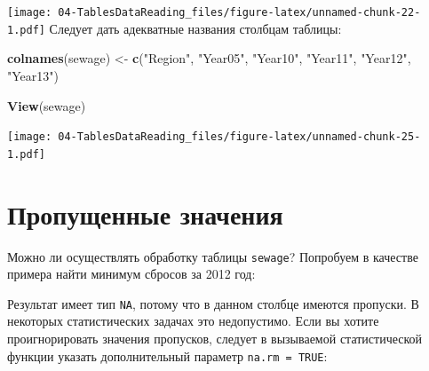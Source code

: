 \documentclass[]{book}
\newenvironment{Shaded}{\begin{snugshade}}{\end{snugshade}}
\newcommand{\KeywordTok}[1]{\textcolor[rgb]{0.13,0.29,0.53}{\textbf{#1}}}
\newcommand{\DataTypeTok}[1]{\textcolor[rgb]{0.13,0.29,0.53}{#1}}
\newcommand{\StringTok}[1]{\textcolor[rgb]{0.31,0.60,0.02}{#1}}
\newcommand{\OtherTok}[1]{\textcolor[rgb]{0.56,0.35,0.01}{#1}}
\newcommand{\OperatorTok}[1]{\textcolor[rgb]{0.81,0.36,0.00}{\textbf{#1}}}
\newcommand{\NormalTok}[1]{#1}
\begin{document}
\texttt{[image: 04-TablesDataReading\_files/figure-latex/unnamed-chunk-22-1.pdf]}
Следует дать адекватные названия столбцам таблицы:

\begin{Shaded}
\begin{Highlighting}[]
\KeywordTok{colnames}\NormalTok{(sewage) <-}\StringTok{ }\KeywordTok{c}\NormalTok{(}\StringTok{"Region"}\NormalTok{, }\StringTok{"Year05"}\NormalTok{, }\StringTok{"Year10"}\NormalTok{, }\StringTok{"Year11"}\NormalTok{, }\StringTok{"Year12"}\NormalTok{, }\StringTok{"Year13"}\NormalTok{)}
\end{Highlighting}
\end{Shaded}

\begin{Shaded}
\begin{Highlighting}[]
\KeywordTok{View}\NormalTok{(sewage)}
\end{Highlighting}
\end{Shaded}

\texttt{[image: 04-TablesDataReading\_files/figure-latex/unnamed-chunk-25-1.pdf]}

\section{Пропущенные значения}\label{missed_values}

Можно ли осуществлять обработку таблицы \texttt{sewage}? Попробуем в
качестве примера найти минимум сбросов за 2012 год:

\begin{Shaded}
\end{Shaded}

Результат имеет тип \texttt{NA}, потому что в данном столбце имеются
пропуски. В некоторых статистических задачах это недопустимо. Если вы
хотите проигнорировать значения пропусков, следует в вызываемой
статистической функции указать дополнительный параметр
\texttt{na.rm\ =\ TRUE}:

\begin{Shaded}
\end{Shaded}
\end{document}
